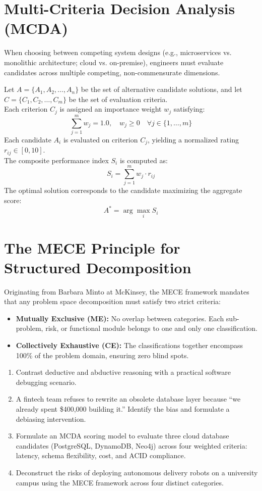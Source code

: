 \section{Multi-Criteria Decision Analysis (MCDA)}
When choosing between competing system designs (e.g., microservices vs. monolithic architecture; cloud vs. on-premise), engineers must evaluate candidates across multiple competing, non-commensurate dimensions.

\begin{methodbox}
Let $A = \{A_1, A_2, \dots, A_n\}$ be the set of alternative candidate solutions, and let $C = \{C_1, C_2, \dots, C_m\}$ be the set of evaluation criteria.\\
Each criterion $C_j$ is assigned an importance weight $w_j$ satisfying:
\[
\sum_{j=1}^m w_j = 1.0, \quad w_j \ge 0 \quad \forall j \in \{1, \dots, m\}
\]
Each candidate $A_i$ is evaluated on criterion $C_j$, yielding a normalized rating $r_{ij} \in [0, 10]$.\\
The composite performance index $S_i$ is computed as:
\[
S_i = \sum_{j=1}^m w_j \cdot r_{ij}
\]
The optimal solution corresponds to the candidate maximizing the aggregate score:
\[
A^* = \arg\max_{i} S_i
\]
\end{methodbox}

\section{The MECE Principle for Structured Decomposition}
Originating from Barbara Minto at McKinsey, the MECE framework mandates that any problem space decomposition must satisfy two strict criteria:
\begin{itemize}
    \item \textbf{Mutually Exclusive (ME):} No overlap between categories. Each sub-problem, risk, or functional module belongs to one and only one classification.
    \item \textbf{Collectively Exhaustive (CE):} The classifications together encompass 100\% of the problem domain, ensuring zero blind spots.
\end{itemize}

\begin{practiceset}
\begin{enumerate}[leftmargin=1.5em]
    \item Contrast deductive and abductive reasoning with a practical software debugging scenario.
    \item A fintech team refuses to rewrite an obsolete database layer because ``we already spent \$400,000 building it.'' Identify the bias and formulate a debiasing intervention.
    \item Formulate an MCDA scoring model to evaluate three cloud database candidates (PostgreSQL, DynamoDB, Neo4j) across four weighted criteria: latency, schema flexibility, cost, and ACID compliance.
    \item Deconstruct the risks of deploying autonomous delivery robots on a university campus using the MECE framework across four distinct categories.
\end{enumerate}
\end{practiceset}
